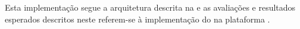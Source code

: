 Esta implementação segue a arquitetura descrita na  e as
avaliações e resultados esperados descritos neste 
referem-se à implementação do \mfog na plataforma \flink.












